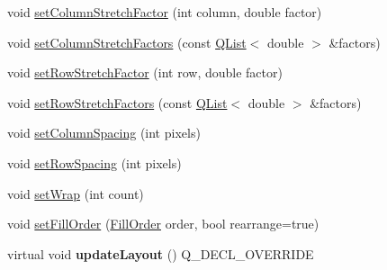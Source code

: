 \begin{DoxyCompactItemize}
\item 
void \hyperlink{class_q_c_p_layout_grid_ae38f31a71687b9d7ee3104852528fb50}{set\+Column\+Stretch\+Factor} (int column, double factor)
\item 
void \hyperlink{class_q_c_p_layout_grid_a6c2591d1a7e2534ce036989543b49e57}{set\+Column\+Stretch\+Factors} (const \hyperlink{class_q_list}{Q\+List}$<$ double $>$ \&factors)
\item 
void \hyperlink{class_q_c_p_layout_grid_a7b0273de5369bd93d942edbaf5b166ec}{set\+Row\+Stretch\+Factor} (int row, double factor)
\item 
void \hyperlink{class_q_c_p_layout_grid_a200b45f9c908f96ebadaa3c8d87a2782}{set\+Row\+Stretch\+Factors} (const \hyperlink{class_q_list}{Q\+List}$<$ double $>$ \&factors)
\item 
void \hyperlink{class_q_c_p_layout_grid_a3a49272aba32bb0fddc3bb2a45a3dba0}{set\+Column\+Spacing} (int pixels)
\item 
void \hyperlink{class_q_c_p_layout_grid_aaef2cd2d456197ee06a208793678e436}{set\+Row\+Spacing} (int pixels)
\item 
void \hyperlink{class_q_c_p_layout_grid_ab36af18d77e4428386d02970382ee598}{set\+Wrap} (int count)
\item 
void \hyperlink{class_q_c_p_layout_grid_affc2f3cfd22f28698c5b29b960d2a391}{set\+Fill\+Order} (\hyperlink{class_q_c_p_layout_grid_a7d49ee08773de6b2fd246edfed353cca}{Fill\+Order} order, bool rearrange=true)
\item 
virtual void {\bfseries update\+Layout} () Q\+\_\+\+D\+E\+C\+L\+\_\+\+O\+V\+E\+R\+R\+I\+DE\hypertarget{class_q_c_p_layout_grid_a6cf43f14d3fa335fd8758561ccf1f78c}{}\label{class_q_c_p_layout_grid_a6cf43f14d3fa335fd8758561ccf1f78c}


\end{DoxyCompactItemize}
